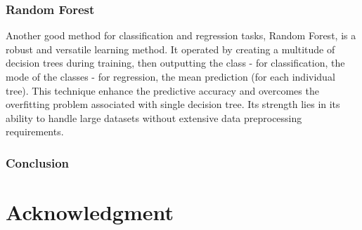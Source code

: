\documentclass[conference]{IEEEtran}
\begin{document}

\subsubsection{Random Forest}
Another good method for classification and regression tasks, Random Forest, is a robust and versatile learning method. It operated by creating a multitude of decision trees during training, then outputting the class - for classification, the mode of the classes - for regression, the mean prediction (for each individual tree).
This technique enhance the predictive accuracy and overcomes the overfitting problem associated with single decision tree.
Its strength lies in its ability to handle large datasets without extensive data preprocessing requirements. 


\vspace{8pt}
\subsubsection{Conclusion}

\vspace{16pt}
\section*{Acknowledgment}
\vspace{12pt}



\end{document}
